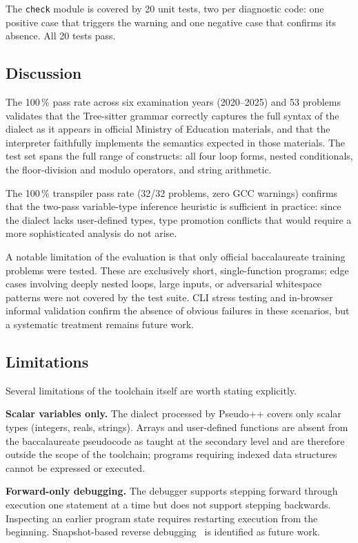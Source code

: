 \documentclass[conference]{IEEEtran}
\begin{document}
The \texttt{check} module is covered by 20 unit tests, two per diagnostic
code: one positive case that triggers the warning and one negative case that
confirms its absence.  All 20 tests pass.

\subsection{Discussion}

The 100\,\% pass rate across six examination years (2020--2025) and 53
problems validates that the Tree-sitter grammar correctly captures the full
syntax of the dialect as it appears in official Ministry of Education materials,
and that the interpreter faithfully implements the semantics expected in those
materials.  The test set spans the full range of constructs: all four loop
forms, nested conditionals, the floor-division and modulo operators, and
string arithmetic.

The 100\,\% transpiler pass rate (32/32 problems, zero GCC warnings) confirms
that the two-pass variable-type inference heuristic is sufficient in practice:
since the dialect lacks user-defined types, type promotion conflicts that
would require a more sophisticated analysis do not arise.

A notable limitation of the evaluation is that only official baccalaureate
training problems were tested.  These are exclusively short, single-function
programs; edge cases involving deeply nested loops, large inputs, or
adversarial whitespace patterns were not covered by the test suite.  CLI
stress testing and in-browser informal validation confirm the absence of obvious
failures in these scenarios, but a systematic treatment remains future work.

\subsection{Limitations}

Several limitations of the toolchain itself are worth stating explicitly.

\textbf{Scalar variables only.}  The dialect processed by Pseudo++ covers only
scalar types (integers, reals, strings).  Arrays and user-defined functions are
absent from the baccalaureate pseudocode as taught at the secondary level and
are therefore outside the scope of the toolchain; programs requiring indexed
data structures cannot be expressed or executed.

\textbf{Forward-only debugging.}  The debugger supports stepping forward
through execution one statement at a time but does not support stepping
backwards.  Inspecting an earlier program state requires restarting execution
from the beginning.  Snapshot-based reverse debugging~\cite{lewis2003omniscient}
is identified as future work.
\end{document}
